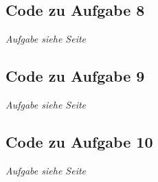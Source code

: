 \documentclass[./Protokollheft.tex]{subfiles}
\begin{document}
\subsection{Code zu Aufgabe 8}
\label{code4.8}
\textit{Aufgabe siehe Seite \pageref{v4.PA.8}}


\subsection{Code zu Aufgabe 9}
\label{code4.9}
\textit{Aufgabe siehe Seite \pageref{v4.PA.9}}


\subsection{Code zu Aufgabe 10}
\label{code4.10}
\textit{Aufgabe siehe Seite \pageref{v4.PA.10}}

\end{document}
